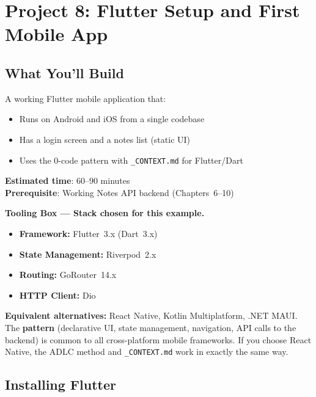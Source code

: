 \chapter{Project 8: Flutter Setup and First Mobile App}

\section*{What You'll Build}
A working Flutter mobile application that:
\begin{itemize}
  \item Runs on Android and iOS from a single codebase
  \item Has a login screen and a notes list (static UI)
  \item Uses the 0-code pattern with \texttt{\_CONTEXT.md} for Flutter/Dart
\end{itemize}

\textbf{Estimated time}: 60--90 minutes\\
\textbf{Prerequisite}: Working Notes API backend (Chapters~6--10)

\begin{notebox}
\textbf{Tooling Box --- Stack chosen for this example.}
\begin{itemize}
  \item \textbf{Framework:} Flutter~3.x (Dart~3.x)
  \item \textbf{State Management:} Riverpod~2.x
  \item \textbf{Routing:} GoRouter~14.x
  \item \textbf{HTTP Client:} Dio
\end{itemize}
\textbf{Equivalent alternatives:} React Native, Kotlin Multiplatform, .NET MAUI. The \textbf{pattern} (declarative UI, state management, navigation, API calls to the backend) is common to all cross-platform mobile frameworks. If you choose React Native, the ADLC method and \texttt{\_CONTEXT.md} work in exactly the same way.
\end{notebox}

\section{Installing Flutter}

